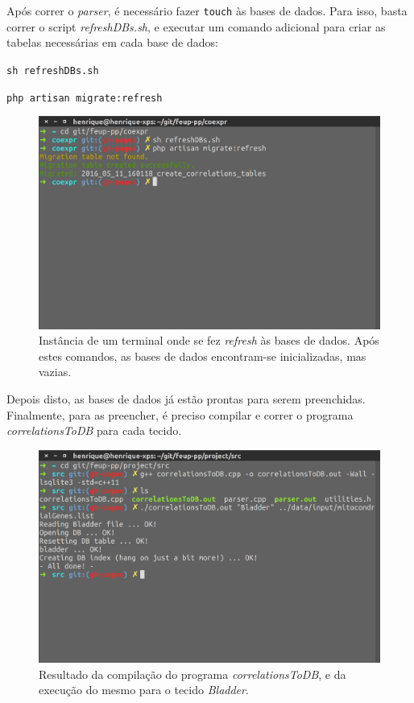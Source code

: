 \medskip

Após correr o \textit{parser}, é necessário fazer \texttt{touch} às bases de dados. Para isso, basta correr o script \textit{refreshDBs.sh}, e executar um comando adicional para criar as tabelas necessárias em cada base de dados:

\smallskip

\texttt{sh refreshDBs.sh}

\smallskip

\texttt{php artisan migrate:refresh}

\medskip

\begin{figure}[ht]
    \centering
    \includegraphics[width=0.7\linewidth]{res/touch-dbs.png}
    \caption{Instância de um terminal onde se fez \textit{refresh} às bases de dados. Após estes comandos, as bases de dados encontram-se inicializadas, mas vazias.}
    \label{fig:touch-db}
\end{figure}

\medskip

Depois disto, as bases de dados já estão prontas para serem preenchidas. Finalmente, para as preencher, é preciso compilar e correr o programa \textit{correlationsToDB} para cada tecido.

\smallskip

\texttt{}

\smallskip

\texttt{}

\medskip

\begin{figure}[ht]
    \centering
    \includegraphics[width=0.7\linewidth]{res/build-tissue-db.png}
    \caption{Resultado da compilação do programa \textit{correlationsToDB}, e da execução do mesmo para o tecido \textit{Bladder}.}
    \label{fig:build-tissue-db}
\end{figure}

